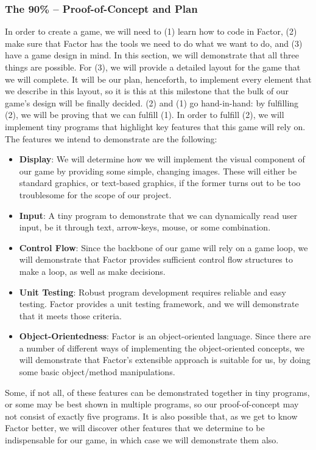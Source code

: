 \documentclass{sig-alternate}
\begin{document}
\subsubsection*{The 90\% -- Proof-of-Concept and Plan}
In order to create a game, we will need to (1) learn how to code in Factor, (2) make sure that Factor has the tools we need to do what we want to do, and (3) have a game design in mind. In this section, we will demonstrate that all three things are possible. For (3), we will provide a detailed layout for the game that we will complete. It will be our plan, henceforth, to implement every element that we describe in this layout, so it is this at this milestone that the bulk of our game's design will be finally decided. (2) and (1) go hand-in-hand: by fulfilling (2), we will be proving that we can fulfill (1).  In order to fulfill (2), we will implement tiny programs that highlight key features that this game will rely on. The features we intend to demonstrate are the following:
\begin{itemize}
\item \textbf{Display}: We will determine how we will implement the visual component of our game by providing some simple, changing images. These will either be standard graphics, or text-based graphics, if the former turns out to be too troublesome for the scope of our project.
\item \textbf{Input}: A tiny program to demonstrate that we can dynamically read user input, be it through text, arrow-keys, mouse, or some combination.
\item \textbf{Control Flow}: Since the backbone of our game will rely on a game loop, we will demonstrate that Factor provides sufficient control flow structures to make a loop, as well as make decisions.
\item \textbf{Unit Testing}: Robust program development requires reliable and easy testing. Factor provides a unit testing framework, and we will demonstrate that it meets those criteria.
\item \textbf{Object-Orientedness}: Factor is an object-oriented language. Since there are a number of different ways of implementing the object-oriented concepts, we will demonstrate that Factor's extensible approach is suitable for us, by doing some basic object/method manipulations.
\end{itemize}
Some, if not all, of these features can be demonstrated together in tiny programs, or some may be best shown in multiple programs, so our proof-of-concept may not consist of exactly five programs. It is also possible that, as we get to know Factor better, we will discover other features that we determine to be indispensable for our game, in which case we will demonstrate them also. 
\end{document}
